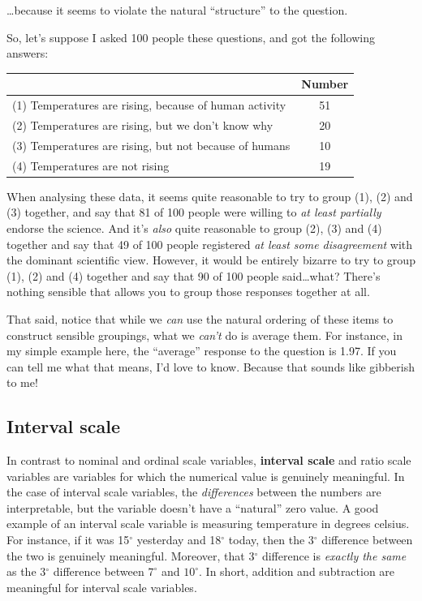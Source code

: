 \documentclass[
]{book}
\begin{document}
\ldots because it seems to violate the natural ``structure'' to the question.

So, let's suppose I asked 100 people these questions, and got the following answers:

\begin{longtable}[]{@{}lc@{}}
\toprule\noalign{}
& Number \\
\midrule\noalign{}
\endhead
\bottomrule\noalign{}
\endlastfoot
(1) Temperatures are rising, because of human activity & 51 \\
(2) Temperatures are rising, but we don't know why & 20 \\
(3) Temperatures are rising, but not because of humans & 10 \\
(4) Temperatures are not rising & 19 \\
\end{longtable}

When analysing these data, it seems quite reasonable to try to group (1), (2) and (3) together, and say that 81 of 100 people were willing to {\emph{at least partially}} endorse the science. And it's {\emph{also}} quite reasonable to group (2), (3) and (4) together and say that 49 of 100 people registered {\emph{at least some disagreement}} with the dominant scientific view. However, it would be entirely bizarre to try to group (1), (2) and (4) together and say that 90 of 100 people said\ldots what? There's nothing sensible that allows you to group those responses together at all.

That said, notice that while we {\emph{can}} use the natural ordering of these items to construct sensible groupings, what we {\emph{can't}} do is average them. For instance, in my simple example here, the ``average'' response to the question is 1.97. If you can tell me what that means, I'd love to know. Because that sounds like gibberish to me!

\subsection{Interval scale}\label{interval-scale}

In contrast to nominal and ordinal scale variables, \textbf{interval scale} and ratio scale variables are variables for which the numerical value is genuinely meaningful. In the case of interval scale variables, the {\emph{differences}} between the numbers are interpretable, but the variable doesn't have a ``natural'' zero value. A good example of an interval scale variable is measuring temperature in degrees celsius. For instance, if it was 15\(^\circ\) yesterday and 18\(^\circ\) today, then the 3\(^\circ\) difference between the two is genuinely meaningful. Moreover, that 3\(^\circ\) difference is {\emph{exactly the same}} as the 3\(^\circ\) difference between \(7^\circ\) and \(10^\circ\). In short, addition and subtraction are meaningful for interval scale variables.
\end{document}
